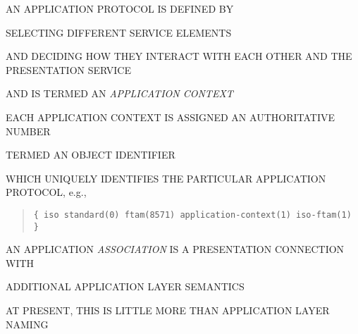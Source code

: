 

\begin{bwslide}

\begin{nrtc}
\item	AN APPLICATION PROTOCOL IS DEFINED BY
    \begin{nrtc}
    \item	SELECTING DIFFERENT SERVICE ELEMENTS

    \item	AND DECIDING HOW THEY INTERACT WITH EACH OTHER AND THE
		PRESENTATION SERVICE 
    \end{nrtc}
    AND IS TERMED AN \emph{APPLICATION CONTEXT}

\item	EACH APPLICATION CONTEXT IS ASSIGNED AN AUTHORITATIVE NUMBER
    \begin{nrtc}
    \item	TERMED AN OBJECT IDENTIFIER
    \end{nrtc}
    WHICH UNIQUELY IDENTIFIES THE PARTICULAR APPLICATION PROTOCOL, e.g.,
\begin{quote}\smaller\begin{verbatim}
{ iso standard(0) ftam(8571) application-context(1) iso-ftam(1) }
\end{verbatim}\end{quote}
\end{nrtc}
\end{bwslide}






\begin{bwslide}

\begin{nrtc}
\item	AN APPLICATION \emph{ASSOCIATION} IS A PRESENTATION CONNECTION WITH
    \begin{nrtc}
    \item	ADDITIONAL APPLICATION LAYER SEMANTICS
    \end{nrtc}

\item	AT PRESENT, THIS IS LITTLE MORE THAN APPLICATION LAYER NAMING
\end{nrtc}
\end{bwslide}


